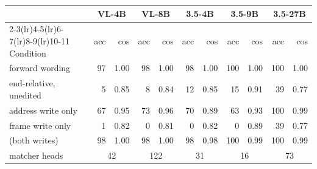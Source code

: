 \begin{tabular}{lrrrrrrrrrr}
\toprule
 & \multicolumn{2}{c}{VL-4B} & \multicolumn{2}{c}{VL-8B} & \multicolumn{2}{c}{3.5-4B} & \multicolumn{2}{c}{3.5-9B} & \multicolumn{2}{c}{3.5-27B} \\
\cmidrule(lr){2-3}\cmidrule(lr){4-5}\cmidrule(lr){6-7}\cmidrule(lr){8-9}\cmidrule(lr){10-11}
Condition & acc & cos & acc & cos & acc & cos & acc & cos & acc & cos \\
\midrule
forward wording & 97 & 1.00 & 98 & 1.00 & 98 & 1.00 & 100 & 1.00 & 100 & 1.00 \\
end-relative, unedited & 5 & 0.85 & 8 & 0.84 & 12 & 0.85 & 15 & 0.91 & 39 & 0.77 \\
address write only & 67 & 0.95 & 73 & 0.96 & 70 & 0.89 & 63 & 0.93 & 100 & 0.99 \\
frame write only & 1 & 0.82 & 0 & 0.81 & 0 & 0.82 & 0 & 0.89 & 39 & 0.77 \\
\rthree{} (both writes) & 98 & 1.00 & 98 & 1.00 & 98 & 0.98 & 100 & 0.99 & 100 & 0.99 \\
\midrule
matcher heads & \multicolumn{2}{c}{42} & \multicolumn{2}{c}{122} & \multicolumn{2}{c}{31} & \multicolumn{2}{c}{16} & \multicolumn{2}{c}{73} \\
\bottomrule
\end{tabular}
